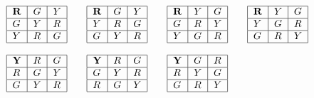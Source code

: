 \documentclass[3p, 10pt, onecolumn]{elsarticle}
\begin{document}
\begin{equation}
\begin{array}{ccccccc}
\begin{tabular}{|l|l|l|}
\hline
$\mathbf{R}$ & $G$ & $Y$ \\ \hline
$G$ & $Y$ & $R$ \\ \hline
$Y$ & $R$ & $G$ \\ \hline
\end{tabular}
&  & 
\begin{tabular}{|l|l|l|}
\hline
$\mathbf{R}$ & $G$ & $Y$ \\ \hline
$Y$ & $R$ & $G$ \\ \hline
$G$ & $Y$ & $R$ \\ \hline
\end{tabular}
&  & 
\begin{tabular}{|l|l|l|}
\hline
$\mathbf{R}$ & $Y$ & $G$ \\ \hline
$G$ & $R$ & $Y$ \\ \hline
$Y$ & $G$ & $R$ \\ \hline
\end{tabular}
&  & 
\begin{tabular}{|l|l|l|}
\hline
$\mathbf{R}$ & $Y$ & $G$ \\ \hline
$Y$ & $G$ & $R$ \\ \hline
$G$ & $R$ & $Y$ \\ \hline
\end{tabular}
\\ 
&  &  &  &  &  &  \\ 
\begin{tabular}{|l|l|l|}
\hline
$\mathbf{Y}$ & $R$ & $G$ \\ \hline
$R$ & $G$ & $Y$ \\ \hline
$G$ & $Y$ & $R$ \\ \hline
\end{tabular}
&  & 
\begin{tabular}{|l|l|l|}
\hline
$\mathbf{Y}$ & $R$ & $G$ \\ \hline
$G$ & $Y$ & $R$ \\ \hline
$R$ & $G$ & $Y$ \\ \hline
\end{tabular}
&  & 
\begin{tabular}{|l|l|l|}
\hline
$\mathbf{Y}$ & $G$ & $R$ \\ \hline
$R$ & $Y$ & $G$ \\ \hline
$G$ & $R$ & $Y$ \\ \hline
\end{tabular}
&  & 
\begin{tabular}{|l|l|l|}

\end{tabular}
\end{array}
\end{equation}
\end{document}
